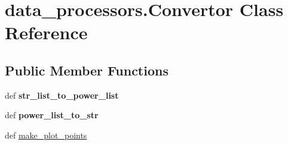 \hypertarget{classdata__processors_1_1_convertor}{\section{data\-\_\-processors.\-Convertor Class Reference}
\label{classdata__processors_1_1_convertor}
}
\subsection*{Public Member Functions}
\begin{DoxyCompactItemize}
\item 
\hypertarget{classdata__processors_1_1_convertor_a94e11e94ade77ad72d4e4d023743be0a}{def {\bfseries str\-\_\-list\-\_\-to\-\_\-power\-\_\-list}}\label{classdata__processors_1_1_convertor_a94e11e94ade77ad72d4e4d023743be0a}

\item 
\hypertarget{classdata__processors_1_1_convertor_a5e2186b5bf7c96c63dc2e2bdc732ea80}{def {\bfseries power\-\_\-list\-\_\-to\-\_\-str}}\label{classdata__processors_1_1_convertor_a5e2186b5bf7c96c63dc2e2bdc732ea80}

\item 
def \hyperlink{classdata__processors_1_1_convertor_a88faafccd5d1c63f535859ce1ce40b80}{make\-\_\-plot\-\_\-points}
\end{DoxyCompactItemize}


